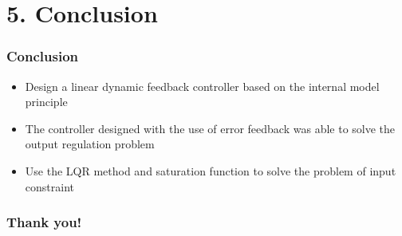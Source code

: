 \documentclass{beamer}
\begin{document}
\section{\large 5. Conclusion}

\begin{frame}[fragile]
	\frametitle{{\color{red} Conclusion}}
    \begin{itemize}
      \item Design a linear dynamic feedback controller based on the internal model principle
      \item The controller designed with the use of error feedback was able to solve the output regulation problem
      \item Use the LQR method and saturation function to solve the problem of input constraint
    \end{itemize}
\end{frame}



\begin{thanksframe}
    \frametitle{Thank you!}
\end{thanksframe}
\end{document}
